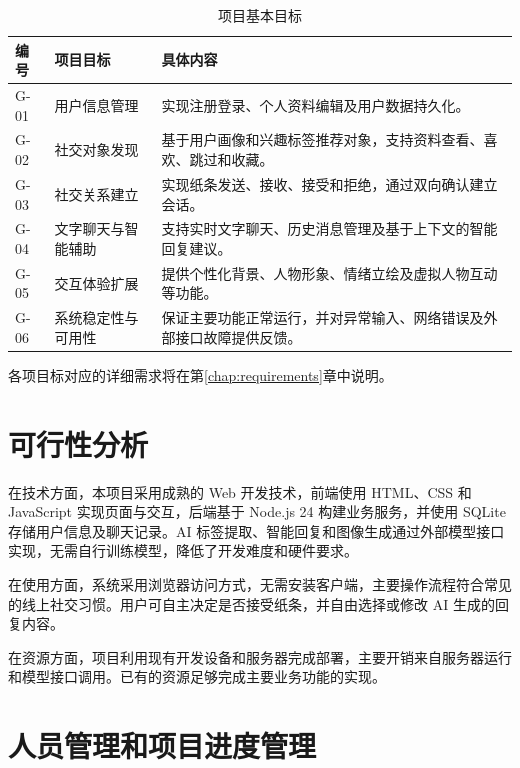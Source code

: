 \begin{table}[H]
\centering
\small
\caption{项目基本目标}
\label{tab:problem-goals}
\begin{tabularx}{\linewidth}{@{}
>{\raggedright\arraybackslash}p{13mm}
>{\raggedright\arraybackslash}p{31mm}
>{\raggedright\arraybackslash}X
@{}}
\toprule
编号 & 项目目标 & 具体内容 \\
\midrule

G-01 & 用户信息管理 &
实现注册登录、个人资料编辑及用户数据持久化。 \\

G-02 & 社交对象发现 &
基于用户画像和兴趣标签推荐对象，支持资料查看、喜欢、跳过和收藏。 \\

G-03 & 社交关系建立 &
实现纸条发送、接收、接受和拒绝，通过双向确认建立会话。 \\

G-04 & 文字聊天与智能辅助 &
支持实时文字聊天、历史消息管理及基于上下文的智能回复建议。 \\

G-05 & 交互体验扩展 &
提供个性化背景、人物形象、情绪立绘及虚拟人物互动等功能。 \\

G-06 & 系统稳定性与可用性 &
保证主要功能正常运行，并对异常输入、网络错误及外部接口故障提供反馈。 \\

\bottomrule
\end{tabularx}
\end{table}

各项目标对应的详细需求将在第\ref{chap:requirements}章中说明。


\section{可行性分析}

在技术方面，本项目采用成熟的 Web 开发技术，前端使用 HTML、CSS 和 JavaScript 实现页面与交互，后端基于 Node.js 24 构建业务服务，并使用 SQLite 存储用户信息及聊天记录。AI 标签提取、智能回复和图像生成通过外部模型接口实现，无需自行训练模型，降低了开发难度和硬件要求。

在使用方面，系统采用浏览器访问方式，无需安装客户端，主要操作流程符合常见的线上社交习惯。用户可自主决定是否接受纸条，并自由选择或修改 AI 生成的回复内容。

在资源方面，项目利用现有开发设备和服务器完成部署，主要开销来自服务器运行和模型接口调用。已有的资源足够完成主要业务功能的实现。


\section{人员管理和项目进度管理}

